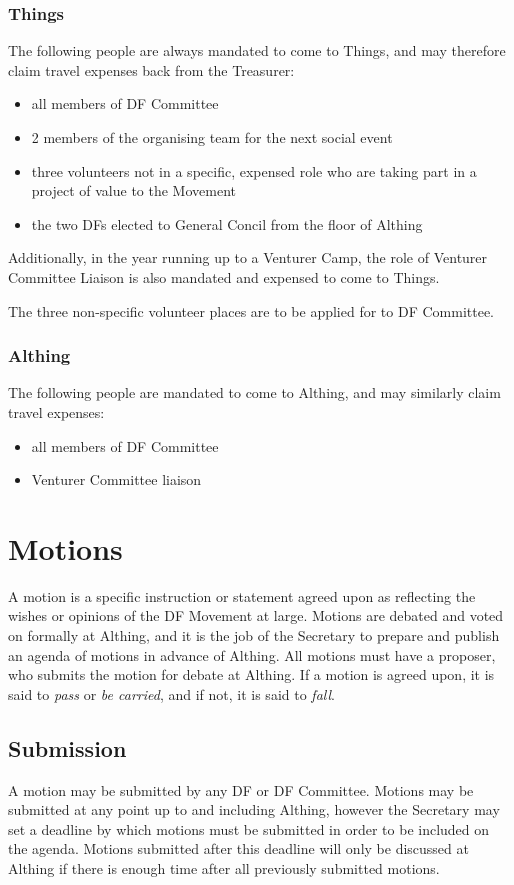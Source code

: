 \documentclass[a4paper, 11pt]{article} %
\begin{document}
\subsubsection{Things}
The following people are always mandated to come to Things, and may therefore claim travel expenses back from the Treasurer:
\begin{itemize}
\item all members of DF Committee
\item 2 members of the organising team for the next social event
\item three volunteers not in a specific, expensed role who are taking part in a project of value to the Movement
\item the two DFs elected to General Concil from the floor of Althing
\end{itemize}

Additionally, in the year running up to a Venturer Camp, the role of Venturer Committee Liaison is also mandated and expensed to come to Things.

The three non-specific volunteer places are to be applied for to DF Committee.

\subsubsection{Althing}
The following people are mandated to come to Althing, and may similarly claim travel expenses:
\begin{itemize}
\item all members of DF Committee
\item Venturer Committee liaison
\end{itemize}

\section{Motions}
A motion is a specific instruction or statement agreed upon as reflecting the wishes or opinions of the DF Movement at large.  Motions are debated and voted on formally at Althing, and it is the job of the Secretary to prepare and publish an agenda of motions in advance of Althing.  All motions must have a proposer, who submits the motion for debate at Althing. If a motion is agreed upon, it is said to \emph{pass} or \emph{be carried}, and if not, it is said to \emph{fall}.

\subsection{Submission}
A motion may be submitted by any DF or DF Committee.  Motions may be submitted at any point up to and including Althing, however the Secretary may set a deadline by which motions must be submitted in order to be included on the agenda.  Motions submitted after this deadline will only be discussed at Althing if there is enough time after all previously submitted motions.
\end{document}
